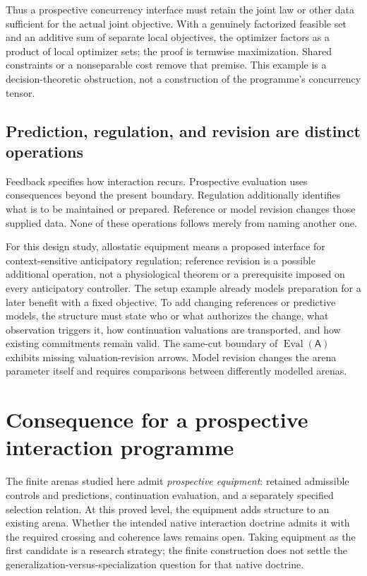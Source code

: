 \documentclass[11pt]{article}
\theoremstyle{definition}
\newcommand{\A}{\mathsf A}
\newcommand{\Eval}{\operatorname{Eval}}
\begin{document}
Thus a prospective concurrency interface must retain the joint law or
other data sufficient for the actual joint objective. With a genuinely
factorized feasible set and an additive sum of separate local objectives,
the optimizer factors as a product of local optimizer sets; the proof is
termwise maximization. Shared constraints or a nonseparable cost remove
that premise. This example is a decision-theoretic obstruction, not a
construction of the programme's concurrency tensor.

\subsection{Prediction, regulation, and revision are distinct operations}
Feedback specifies how interaction recurs. Prospective evaluation uses
consequences beyond the present boundary. Regulation additionally identifies
what is to be maintained or prepared. Reference or model revision changes
those supplied data. None of these operations follows merely from naming
another one.

For this design study, allostatic equipment means a proposed interface for
context-sensitive anticipatory regulation; reference revision is a possible
additional operation, not a physiological theorem or a prerequisite imposed
on every anticipatory controller. The setup example already models
preparation for a later benefit with a fixed objective. To add changing
references or predictive models, the structure must state who or what
authorizes the change, what observation triggers it, how continuation
valuations are transported, and how existing commitments remain valid.
The same-cut boundary of \(\Eval(\A)\) exhibits missing valuation-revision
arrows. Model revision changes the arena parameter itself and requires
comparisons between differently modelled arenas.

\section{Consequence for a prospective interaction programme}
\label{sec:consequence}
The finite arenas studied here admit \emph{prospective equipment}:
retained admissible controls and predictions, continuation evaluation,
and a separately specified selection relation. At this proved level,
the equipment adds structure to an existing arena. Whether the intended
native interaction doctrine admits it with the required crossing and
coherence laws remains open. Taking equipment as the first candidate is a
research strategy; the finite construction does not settle the
generalization-versus-specialization question for that native doctrine.
\end{document}

